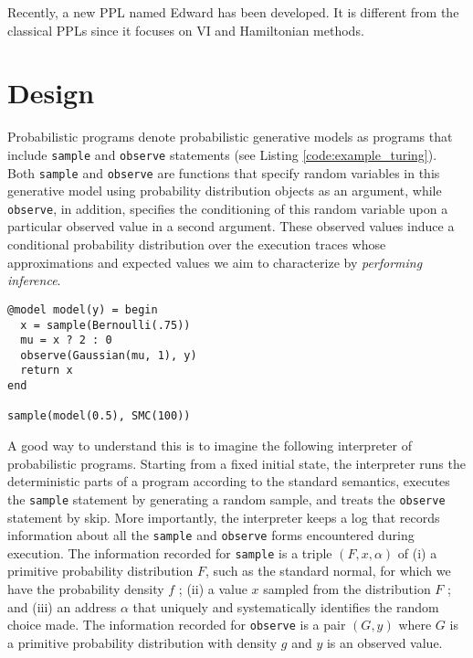 Recently, a new \gls{PPL} named Edward \cite{Edward} has been developed. It is different from the classical \glspl{PPL} since it focuses on \gls{VI} and Hamiltonian methods.


\section{Design}

Probabilistic programs denote probabilistic generative models as programs that include \texttt{sample} and \texttt{observe} statements (see Listing \ref{code:example_turing}). Both \texttt{sample} and \texttt{observe} are functions that specify random variables in this generative model using probability distribution objects as an argument, while \texttt{observe}, in addition, specifies the conditioning of this random variable upon a particular observed value in a second argument. These observed values induce a conditional probability distribution over the execution traces whose approximations and expected values we aim to characterize by \textit{performing inference}. \\

\begin{lstlisting}[caption={Example of a Turing.jl model},captionpos=b,label=code:example_turing]
@model model(y) = begin
  x = sample(Bernoulli(.75))
  mu = x ? 2 : 0
  observe(Gaussian(mu, 1), y)
  return x
end

sample(model(0.5), SMC(100))
\end{lstlisting}

A good way to understand this is to imagine the following interpreter of probabilistic programs. Starting from a fixed initial state, the interpreter runs the deterministic parts of a program according to the standard semantics, executes the \texttt{sample} statement by generating a random sample, and treats the \texttt{observe} statement by skip. More importantly, the interpreter keeps a log that records information about all the \texttt{sample} and \texttt{observe} forms encountered during execution. The information recorded for \texttt{sample} is a triple $(F, x, \alpha)$ of (i) a primitive probability distribution $F$, such as the standard normal, for which we have the probability density $f$ ; (ii) a value $x$ sampled from the distribution $F$ ; and (iii) an address $\alpha$ that uniquely and systematically identifies the random choice made. The information recorded for \texttt{observe} is a pair $(G,y)$ where $G$ is a primitive probability distribution with density $g$ and $y$ is an observed value.

